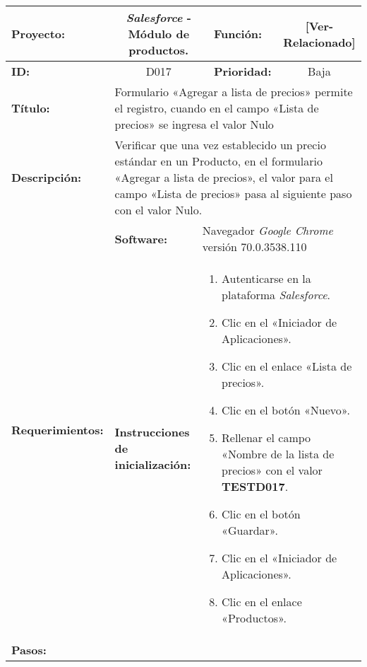 \begin{table}
\renewcommand{\arraystretch}{1}
\linespread{1}
\centering
\begin{tabular}{|p{2.5cm}|p{2.8cm}|p{2.2cm}|p{2.8cm}|p{2.2cm}|}
\hline
\footnotesize{\textbf{Proyecto:}} &
\multicolumn{2}{c|}{\footnotesize{\emph{Salesforce} - Módulo de productos.}} &
\footnotesize{\textbf{Función:}} &
\multicolumn{1}{c|}{\footnotesize{[Ver-Relacionado]}} \\
\hline
\footnotesize{\textbf{ID:}} & \multicolumn{2}{c|}{\footnotesize{D017}} &
\footnotesize{\textbf{Prioridad:}} &
\multicolumn{1}{c|}{\footnotesize{Baja}} \\
\hline
\footnotesize{\textbf{Título:}} &
\multicolumn{4}{p{12.4cm}|}{\footnotesize{Formulario «Agregar a lista de
precios» permite el registro, cuando en el campo «Lista de precios» se ingresa
el valor Nulo}} \\
\hline
\footnotesize{\textbf{Descripción:}} &
\multicolumn{4}{p{12.4cm}|}{\footnotesize{Verificar que una vez establecido un
precio estándar en un Producto, en el formulario «Agregar a lista de precios»,
el valor para el campo «Lista de precios» pasa al siguiente paso con el valor
Nulo.}} \\
\hline
\multirow{2}{*}{\footnotesize{\textbf{Requerimientos:}}} &
\footnotesize{\textbf{Software:}} &
\multicolumn{3}{p{7.8cm}|}{\footnotesize{Navegador \emph{Google Chrome}
versión 70.0.3538.110}} \\
\cline{2-5}
& \footnotesize{\textbf{Instrucciones de inicialización:}} &
\multicolumn{3}{p{7.8cm}|}{\footnotesize{
\vspace{-3mm}
\begin{enumerate}
\item Autenticarse en la plataforma \emph{Salesforce}.
\item Clic en el «Iniciador de Aplicaciones».
\item Clic en el enlace «Lista de precios».
\item Clic en el botón «Nuevo».
\item Rellenar el campo «Nombre de la lista de precios» con el valor
    \textbf{TESTD017}.
\item Clic en el botón «Guardar».
\item Clic en el «Iniciador de Aplicaciones».
\item Clic en el enlace «Productos».
\end{enumerate}
\vspace{-5mm}
}} \\
\hline
\footnotesize{\textbf{Pasos:}} &

\end{tabular}
\end{table}
